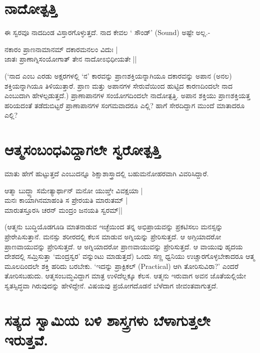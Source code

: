 \section*{ನಾದೋತ್ಪತ್ತಿ}

ಈ ಸ್ವರವೂ ನಾದದಿಂಡ ವಿಸ್ತಾರಗೊಳ್ಳುತ್ತದೆ. ನಾದ ಕೇವಲ ` ಸೌಂಡ್' (Sound) ಅಷ್ಟೇ ಅಲ್ಲ.-
\begin{shloka}
ನಕಾರಂ ಪ್ರಾಣನಾಮಾನಮ್ ದಕಾರಮನಲಂ ವಿದುಃ |\\
ಜಾತಃ ಪ್ರಾಣಾಗ್ನಿಸಂಯೋಗಾತ್ ತೇನ ನಾದೋಽಭಿಧೀಯತೇ ||
\end{shloka}

(`ನಾದ ಎಂಬ ಎರಡು ಅಕ್ಷರಗಳಲ್ಲಿ  `ನ' ಕಾರವನ್ನು  ಪ್ರಾಣಶಕ್ತಿಯನ್ನಾಗಿಯೂ ದಕಾರವನ್ನು ಅಪಾನ (ಅನಲ) ಶಕ್ತಿಯನ್ನಾಗಿಯೂ ತಿಳಿಯುತ್ತಾರೆ. ಪ್ರಾಣ ಮತ್ತು ಅಪಾನಗಳ ಸೇರುವೆಯಿಂದ ಹುಟ್ಟಿದ ಕಾರಣದಿಂದಲೇ ನಾದ ಎಂಬುದಾಗಿ ಹೇಳಲ್ಪಡುತ್ತದೆ.) ಪ್ರಾಣಾಪಾನಗಳ ಸಂಯೋಗದಿಂದಲೇ ನಾದೋತ್ಪತ್ತಿ. ಅಪಾನ ಶಕ್ತಿಯು ಪ್ರಾಣಶಕ್ತಿಯತ್ತ ಹರಿಯದಂತೆ ತಡೆದುಬಿಟ್ಟರೆ ಪ್ರಾಣಾಪಾನಗಳ ಸಂಗಮವಾದರೂ ಎಲ್ಲಿ? ಹಾಗೆ ಸೇರದಿದ್ದಾಗ ಮುಂದೆ ಮಾತಾದರೂ ಎಲ್ಲಿ?

\section*{ಆತ್ಮಸಂಬಂಧವಿದ್ದಾಗಲೇ ಸ್ವರೋತ್ಪತ್ತಿ}

ಮಾತು ಹೇಗೆ ಹುಟ್ಟುತ್ತದೆ ಎಂಬುದನ್ನೂ  ಶಿಕ್ಷಾಶಾಸ್ತ್ರಾದಲ್ಲಿ ಬಹುಮನೋಹರವಾಗಿ ವಿವರಿಸಿದ್ದಾರೆ.

\begin{shloka}
ಆತ್ಮಾ ಬುದ್ಧ್ಯಾ ಸಮೇತ್ಯಾರ್ಥಾನ್ ಮನೋ ಯುಙ್ತೇ ವಿವಕ್ಷಯಾ |\\
ಮನಃ ಕಾಯಾಗಿನಮಾಹಂತಿ ಸ ಪ್ರೇರಯತಿ ಮಾರುತಮ್ |\\
ಮಾರುತಸ್ತೂರಸಿ ಚರನ್ ಮಂದ್ರಂ ಜನಯತಿ ಸ್ವರಮ್||
\end{shloka}

(ಆತ್ಮನು ಬುದ್ಧಿಯೊಡಗೂಡಿ ಮಾತನಾಡುವ ಇಚ್ಛೆಯಿಂದ ತನ್ನ ಅಭಿಪ್ರಾಯವನ್ನು ಪ್ರಕಟಿಸಲು ಮನಸ್ಸನ್ನು  ಪ್ರೇರೇಪಿಸುತ್ತಾನೆ. ಮನಸ್ಸು ಶರೀರದಲ್ಲಿ ಕೆಲಸ ಮಾಡುವ ಅಗ್ನಿಯನ್ನು ಪ್ರೇರಿಸುತ್ತದೆ.  ಆ ಅಗ್ಗಿಯಾದರೋ ಪ್ರಾಣವಾಯುವನ್ನು ಪ್ರೇರಿಸುತ್ತದೆ. ಆ ಅಗ್ನಿಯಾದರೋ ಪ್ರಾಣವಾಯುವನ್ನು ಪ್ರೇರಿಸುತ್ತದೆ. ಆ ವಾಯುವು ಹೃದಯ ದೇಶದಲ್ಲಿ ಸಮ್ರಿಸುತ್ತಾ `ಮಂದ್ರಸ್ವರ' ವನ್ನುಂಟು ಮಾಡುತ್ತದೆ) ಒಂದು ಸಣ್ಣ ಧ್ವನಿಯು ಉಚ್ಚಾರಗೊಳ್ಳಬೇಕಾದರೂ ಆತ್ಮ ಮೂಲದಿಂದಲೇ ಶಕ್ತಿ ಹರಿದು ಬರಬೇಕು. `ಇದನ್ನು ಪ್ರಾಕ್ಟಿಕಲ್ (Practical) ಆಗಿ ತೋರಿಸುವಿರಾ?' ಎಂದರೆ ತೋರಿಸಬಹುದು. ಆತ್ಮಸಂಬಮ್ಧವಿದ್ದಾಗ ಮಾತ್ರ ಉಳಿದೆಲ್ಲಕ್ಕೂ ಕೆಲಸ. ಆತ್ಮನು ಇರುವಾಗ ಅವನ ಜೊತೆಯಲ್ಲಿಯೇ ಸ್ವತಸ್ಸಿದ್ಧವಾ ಗಿರುವುದನ್ನು  ಹೇಳಿದ್ದೇನೆ. ವಿಷಯವು ಪ್ರಯೋಗದೊಡನೆ ಬೆಳೆದಾಗ ಜೀವಂತವಾಗುತ್ತದೆ.

\section*{ಸತ್ಯದ ಸ್ವಾಮಿಯ ಬಳಿ ಶಾಸ್ತ್ರಗಳು ಬೆಳಾಗುತ್ತಲೇ ಇರುತ್ತವೆ.}

